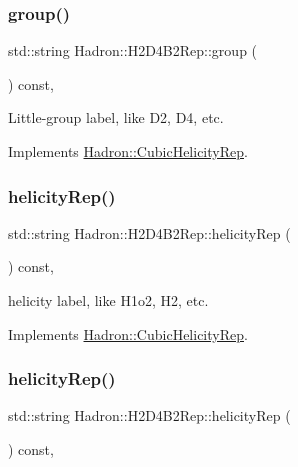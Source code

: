 \subsubsection{\texorpdfstring{group()}{group()}\hspace{0.1cm}{\footnotesize\ttfamily [5/5]}}
{\footnotesize\ttfamily std\+::string Hadron\+::\+H2\+D4\+B2\+Rep\+::group (\begin{DoxyParamCaption}{ }\end{DoxyParamCaption}) const\hspace{0.3cm}{\ttfamily [inline]}, {\ttfamily [virtual]}}

Little-\/group label, like D2, D4, etc. 

Implements \mbox{\hyperlink{structHadron_1_1CubicHelicityRep_a101a7d76cd8ccdad0f272db44b766113}{Hadron\+::\+Cubic\+Helicity\+Rep}}.

\mbox{\label{structHadron_1_1H2D4B2Rep_a1ec65d13eaf3747ef59295d3cd1aa002}} 
\subsubsection{\texorpdfstring{helicityRep()}{helicityRep()}\hspace{0.1cm}{\footnotesize\ttfamily [1/3]}}
{\footnotesize\ttfamily std\+::string Hadron\+::\+H2\+D4\+B2\+Rep\+::helicity\+Rep (\begin{DoxyParamCaption}{ }\end{DoxyParamCaption}) const\hspace{0.3cm}{\ttfamily [inline]}, {\ttfamily [virtual]}}

helicity label, like H1o2, H2, etc. 

Implements \mbox{\hyperlink{structHadron_1_1CubicHelicityRep_af1096946b7470edf0a55451cc662f231}{Hadron\+::\+Cubic\+Helicity\+Rep}}.

\mbox{\label{structHadron_1_1H2D4B2Rep_a1ec65d13eaf3747ef59295d3cd1aa002}} 
\subsubsection{\texorpdfstring{helicityRep()}{helicityRep()}\hspace{0.1cm}{\footnotesize\ttfamily [2/3]}}
{\footnotesize\ttfamily std\+::string Hadron\+::\+H2\+D4\+B2\+Rep\+::helicity\+Rep (\begin{DoxyParamCaption}{ }\end{DoxyParamCaption}) const\hspace{0.3cm}{\ttfamily [inline]}, {\ttfamily [virtual]}}

